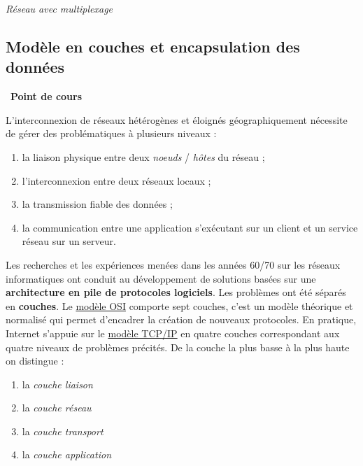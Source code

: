 \documentclass[
  11pt,
]{article}
\providecommand{\tightlist}{%
  \setlength{\itemsep}{0pt}\setlength{\parskip}{0pt}}
\newcounter{def}
\newcounter{cours}
\newenvironment{cours}[1]
{\par \medskip   \addtocounter{cours}{1} \noindent  
\begin{bclogo}[arrondi =0.1,  ombre = true, barre=none, logo=\bcbook, marge=4]{~\textbf{Point de cours} \textbf{\thecours} {\itshape #1} }  \par}
{
\end{bclogo}
 \par \bigskip }
\newcounter{logi}
\begin{document}
\emph{Réseau avec multiplexage}

\hypertarget{moduxe8le-en-couches-et-encapsulation-des-donnuxe9es}{%
\subsection{Modèle en couches et encapsulation des
données}\label{moduxe8le-en-couches-et-encapsulation-des-donnuxe9es}}

\begin{cours}{}

L'interconnexion de réseaux hétérogènes et éloignés géographiquement
nécessite de gérer des problématiques à plusieurs niveaux :

\begin{enumerate}
\def\labelenumi{\arabic{enumi}.}
\tightlist
\item
  la liaison physique entre deux \emph{noeuds} / \emph{hôtes} du réseau
  ;
\item
  l'interconnexion entre deux réseaux locaux ;
\item
  la transmission fiable des données ;
\item
  la communication entre une application s'exécutant sur un client et un
  service réseau sur un serveur.
\end{enumerate}

Les recherches et les expériences menées dans les années 60/70 sur les
réseaux informatiques ont conduit au développement de solutions basées
sur une \textbf{architecture en pile de protocoles logiciels}. Les
problèmes ont été séparés en \textbf{couches}. Le
\href{https://fr.wikipedia.org/wiki/Mod\%C3\%A8le_OSI}{modèle OSI}
comporte sept couches, c'est un modèle théorique et normalisé qui permet
d'encadrer la création de nouveaux protocoles. En pratique, Internet
s'appuie sur le
\href{https://fr.wikipedia.org/wiki/Suite_des_protocoles_Internet}{modèle
TCP/IP} en quatre couches correspondant aux quatre niveaux de problèmes
précités. De la couche la plus basse à la plus haute on distingue :

\begin{enumerate}
\def\labelenumi{\arabic{enumi}.}
\tightlist
\item
  la \emph{couche liaison}
\item
  la \emph{couche réseau}
\item
  la \emph{couche transport}
\item
  la \emph{couche application}
\end{enumerate}


\end{cours}
\end{document}
